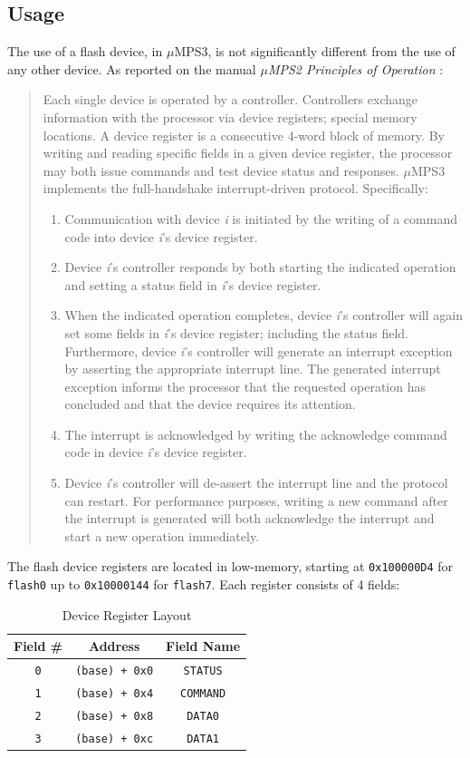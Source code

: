\documentclass[12pt,a4paper,openright,twoside]{report}
\begin{document}
\subsection{Usage}
The use of a flash device, in $\mu$MPS3, is not significantly different from the use of any other device. As reported on the manual \textit{$\mu$MPS2 Principles of Operation} \cite{pops}:
\begin{quote}
	Each single device is operated by a controller.
	Controllers exchange information with the processor via device registers; special memory locations.
	A device register is a consecutive 4-word block of memory.
	By writing and reading specific fields in a given device register, the processor may both issue commands and test device status and responses.
	$\mu$MPS3 implements the full-handshake interrupt-driven protocol.
	Specifically:
	\begin{enumerate}
		\item Communication with device \textit{i} is initiated by the writing of a command code into device \textit{i}'s device register.
		\item Device \textit{i}'s controller responds by both starting the indicated operation and setting a status field in \textit{i}'s device register.
		\item When the indicated operation completes, device \textit{i}'s controller will again set some fields in \textit{i}'s device register; including the status field.
		      Furthermore, device \textit{i}'s controller will generate an interrupt exception by asserting the appropriate interrupt line.
		      The generated interrupt exception informs the processor that the requested operation has concluded and that the device requires its attention.
		\item The interrupt is acknowledged by writing the acknowledge command code in device \textit{i}'s device register.
		\item Device \textit{i}'s controller will de-assert the interrupt line and the protocol can restart.
		      For performance purposes, writing a new command after the interrupt is generated will both acknowledge the interrupt and start a new operation immediately.
	\end{enumerate}
\end{quote}
The flash device registers are located in low-memory, starting at \texttt{0x100000D4} for \texttt{flash0} up to \texttt{0x10000144} for \texttt{flash7}.
Each register consists of 4 fields:
\begin{table}[h]
	\centering
	\begin{tabular}{c|c|c}
		Field \#   & Address               & Field Name       \\  \hline\hline
		\texttt{0} & \texttt{(base) + 0x0} & \texttt{STATUS}  \\ \hline
		\texttt{1} & \texttt{(base) + 0x4} & \texttt{COMMAND} \\ \hline
		\texttt{2} & \texttt{(base) + 0x8} & \texttt{DATA0}   \\ \hline
		\texttt{3} & \texttt{(base) + 0xc} & \texttt{DATA1}
	\end{tabular}
	\caption{Device Register Layout}
	\label{tab:device_register_layout}
\end{table}
\end{document}
